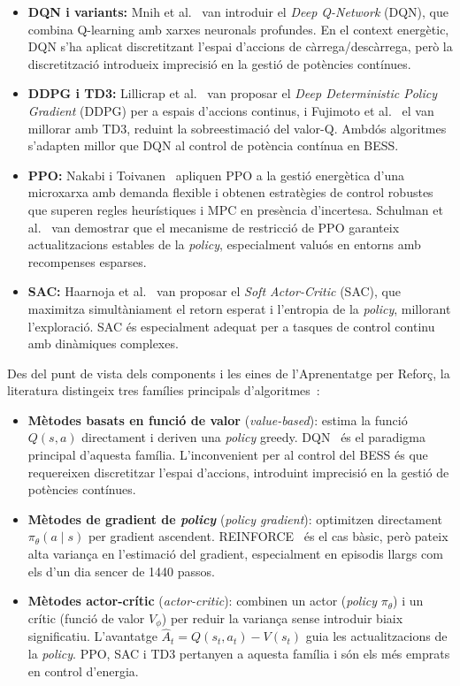 \documentclass[a4paper,12pt,twoside]{ThesisStyle}
\begin{document}
\begin{itemize}
    \item \textbf{DQN i variants:} Mnih et al.~\cite{mnih2015dqn} van introduir el \textit{Deep Q-Network} (DQN), que combina Q-learning amb xarxes neuronals profundes. En el context energètic, DQN s'ha aplicat discretitzant l'espai d'accions de càrrega/descàrrega, però la discretització introdueix imprecisió en la gestió de potències contínues.
    \item \textbf{DDPG i TD3:} Lillicrap et al.~\cite{lillicrap2016ddpg} van proposar el \textit{Deep Deterministic Policy Gradient} (DDPG) per a espais d'accions continus, i Fujimoto et al.~\cite{fujimoto2018td3} el van millorar amb TD3, reduint la sobreestimació del valor-Q. Ambdós algoritmes s'adapten millor que DQN al control de potència contínua en BESS.
    \item \textbf{PPO:} Nakabi i Toivanen~\cite{nakabi2021deep} apliquen PPO a la gestió energètica d'una microxarxa amb demanda flexible i obtenen estratègies de control robustes que superen regles heurístiques i MPC en presència d'incertesa. Schulman et al.~\cite{schulman2017ppo} van demostrar que el mecanisme de restricció de PPO garanteix actualitzacions estables de la \textit{policy}, especialment valuós en entorns amb recompenses esparses.
    \item \textbf{SAC:} Haarnoja et al.~\cite{haarnoja2018sac} van proposar el \textit{Soft Actor-Critic} (SAC), que maximitza simultàniament el retorn esperat i l'entropia de la \textit{policy}, millorant l'exploració. SAC és especialment adequat per a tasques de control continu amb dinàmiques complexes.
\end{itemize}

Des del punt de vista dels components i les eines de l'Aprenentatge per Reforç, la literatura distingeix tres famílies principals d'algoritmes~\cite{sutton2018rl}:

\begin{itemize}
    \item \textbf{Mètodes basats en funció de valor} (\textit{value-based}): estima la funció $Q(s,a)$ directament i deriven una \textit{policy} greedy. DQN~\cite{mnih2015dqn} és el paradigma principal d'aquesta família. L'inconvenient per al control del BESS és que requereixen discretitzar l'espai d'accions, introduint imprecisió en la gestió de potències contínues.
    \item \textbf{Mètodes de gradient de \textit{policy}} (\textit{policy gradient}): optimitzen directament $\pi_\theta(a \mid s)$ per gradient ascendent. REINFORCE~\cite{sutton2018rl} és el cas bàsic, però pateix alta variança en l'estimació del gradient, especialment en episodis llargs com els d'un dia sencer de 1440 passos.
    \item \textbf{Mètodes actor-crític} (\textit{actor-critic}): combinen un actor (\textit{policy} $\pi_\theta$) i un crític (funció de valor $V_\phi$) per reduir la variança sense introduir biaix significatiu. L'avantatge $\hat{A}_t = Q(s_t,a_t) - V(s_t)$ guia les actualitzacions de la \textit{policy}. PPO, SAC i TD3 pertanyen a aquesta família i són els més emprats en control d'energia.
\end{itemize}
\end{document}
